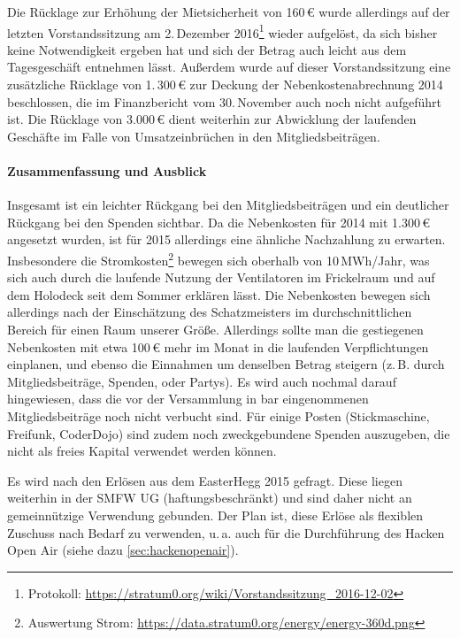 \documentclass{s0minutes}
\begin{document}
Die Rücklage zur Erhöhung der Mietsicherheit von 160\,€ wurde allerdings auf der
letzten Vorstandssitzung am 2.\,Dezember 2016\footnote{Protokoll:
\url{https://stratum0.org/wiki/Vorstandssitzung_2016-12-02}} wieder aufgelöst,
da sich bisher keine Notwendigkeit ergeben hat und sich der Betrag auch leicht
aus dem Tagesgeschäft entnehmen lässt. Außerdem wurde auf dieser
Vorstandssitzung eine zusätzliche Rücklage von 1{.}\,300\,€ zur Deckung der
Nebenkostenabrechnung 2014 beschlossen, die im Finanzbericht vom 30.\,November
auch noch nicht aufgeführt ist. Die Rücklage von 3{.}000\,€ dient weiterhin zur
Abwicklung der laufenden Geschäfte im Falle von Umsatzeinbrüchen in den
Mitgliedsbeiträgen.

\paragraph{Zusammenfassung und Ausblick}
Insgesamt ist ein leichter Rückgang bei den Mitgliedsbeiträgen und ein
deutlicher Rückgang bei den Spenden sichtbar. Da die Nebenkosten für 2014 mit
1{.}300\,€ angesetzt wurden, ist für 2015 allerdings eine ähnliche Nachzahlung zu
erwarten. Insbesondere die Stromkosten\footnote{Auswertung Strom:
\url{https://data.stratum0.org/energy/energy-360d.png}} bewegen sich oberhalb
von 10\,MWh/Jahr, was sich auch durch die laufende Nutzung der Ventilatoren
im Frickelraum und auf dem Holodeck seit dem Sommer erklären lässt. Die
Nebenkosten bewegen sich allerdings nach der Einschätzung des Schatzmeisters im
durchschnittlichen Bereich für einen Raum unserer Größe. Allerdings sollte man
die gestiegenen Nebenkosten mit etwa 100\,€ mehr im Monat in die laufenden
Verpflichtungen einplanen, und ebenso die Einnahmen um denselben Betrag
steigern (z.\,B. durch Mitgliedsbeiträge, Spenden, oder Partys). Es wird auch
nochmal darauf hingewiesen, dass die vor der Versammlung in bar eingenommenen
Mitgliedsbeiträge noch nicht verbucht sind. Für einige Posten (Stickmaschine,
Freifunk, CoderDojo) sind zudem noch zweckgebundene Spenden auszugeben, die
nicht als freies Kapital verwendet werden können.

Es wird nach den Erlösen aus dem EasterHegg 2015 gefragt. Diese liegen weiterhin
in der SMFW UG (haftungsbeschränkt) und sind daher nicht an gemeinnützige
Verwendung gebunden. Der Plan ist, diese Erlöse als flexiblen Zuschuss nach
Bedarf zu verwenden, u.\,a. auch für die Durchführung des Hacken Open Air
(siehe dazu \ref{sec:hackenopenair}).
\end{document}
